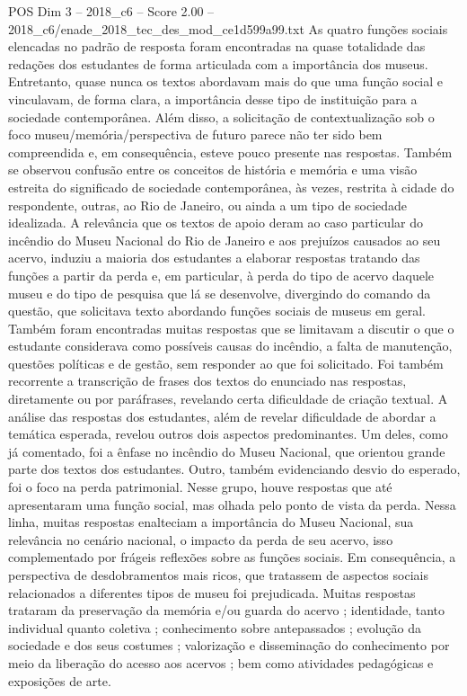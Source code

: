 \begin{textsample}{POS Dim 3 – 2018\_c6 – Score 2.00 – 2018\_c6/enade\_2018\_tec\_des\_mod\_ce1d599a99.txt}
As quatro funções sociais elencadas no padrão de resposta foram encontradas na quase totalidade das redações dos estudantes de forma articulada com a importância dos museus.
Entretanto, quase nunca os textos abordavam mais do que uma função social e vinculavam, de forma clara, a importância desse tipo de instituição para a sociedade contemporânea.
Além disso, a solicitação de contextualização sob o foco museu/memória/perspectiva de futuro parece não ter sido bem compreendida e, em consequência, esteve pouco presente nas respostas.
Também se observou confusão entre os conceitos de história e memória e uma visão estreita do significado de sociedade contemporânea, às vezes, restrita à cidade do respondente, outras, ao Rio de Janeiro, ou ainda a um tipo de sociedade idealizada.
A relevância que os textos de apoio deram ao caso particular do incêndio do Museu Nacional do Rio de Janeiro e aos prejuízos causados ao seu acervo, induziu a maioria dos estudantes a elaborar respostas tratando das funções a partir da perda e, em particular, à perda do tipo de acervo daquele museu e do tipo de pesquisa que lá se desenvolve, divergindo do comando da questão, que solicitava texto abordando funções sociais de museus em geral.
Também foram encontradas muitas respostas que se limitavam a discutir o que o estudante considerava como possíveis causas do incêndio, a falta de manutenção, questões políticas e de gestão, sem responder ao que foi solicitado.
Foi também recorrente a transcrição de frases dos textos do enunciado nas respostas, diretamente ou por paráfrases, revelando certa dificuldade de criação textual.
A análise das respostas dos estudantes, além de revelar dificuldade de abordar a temática esperada, revelou outros dois aspectos predominantes.
Um deles, como já comentado, foi a ênfase no incêndio do Museu Nacional, que orientou grande parte dos textos dos estudantes.
Outro, também evidenciando desvio do esperado, foi o foco na perda patrimonial.
Nesse grupo, houve respostas que até apresentaram uma função social, mas olhada pelo ponto de vista da perda.
Nessa linha, muitas respostas enalteciam a importância do Museu Nacional, sua relevância no cenário nacional, o impacto da perda de seu acervo, isso complementado por frágeis reflexões sobre as funções sociais.
Em consequência, a perspectiva de desdobramentos mais ricos, que tratassem de aspectos sociais relacionados a diferentes tipos de museu foi prejudicada.
Muitas respostas trataram da preservação da memória e/ou guarda do acervo ; identidade, tanto individual quanto coletiva ; conhecimento sobre antepassados ; evolução da sociedade e dos seus costumes ; valorização e disseminação do conhecimento por meio da liberação do acesso aos acervos ; bem como atividades pedagógicas e exposições de arte.

\end{textsample}

